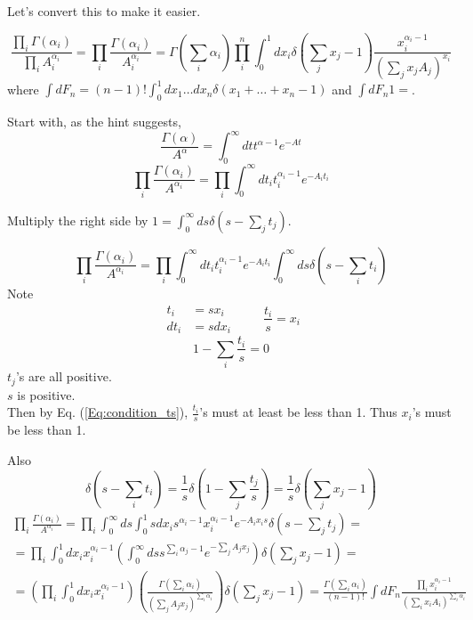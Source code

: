 \documentclass[twoside]{amsart}
\begin{document}
Let's convert this to make it easier.  

\[
\frac{ \prod_i \Gamma(\alpha_i) }{ \prod_i A_i^{\alpha_i } }  = \prod_i \frac{ \Gamma( \alpha_i ) }{ A_i^{\alpha_i } } = \Gamma( \sum_i \alpha_i ) \prod_i^n \int_0^1 dx_i \delta(\sum_j x_j - 1 ) \frac{ x_i^{ \alpha_i -1 } }{ \left(  \sum_j x_j A_j \right)^{x_i } } 
\]
where $\int dF_n = (n-1)! \int_0^1 dx_1 \dots dx_n \delta(x_1 + \dots + x_n - 1 )$ and $\int dF_n 1 =$.  

Start with, as the hint suggests, 
\[
\frac{ \Gamma(\alpha) }{ A^{\alpha} } = \int_0^{\infty} dt t^{\alpha- 1 } e^{-At}
\]
\[
 \prod_i \frac{ \Gamma(\alpha_i ) }{ A^{\alpha_i} } =\prod_i \int_0^{\infty} dt_i t_i^{\alpha_i -1 } e^{ - A_i t_i }
\]

Multiply the right side by $1 = \int_0^{\infty} ds \delta( s - \sum_j t_j )$.  

\[
\prod_i \frac{ \Gamma(\alpha_i ) }{ A^{\alpha_i }} = \prod_i \int_0^{\infty} dt_i t_i^{\alpha_i -1 } e^{ - A_i t_i} \int_0^{\infty} ds \delta( s-  \sum_i t_i  )
\]
Note
\[
\begin{aligned} t_i & = sx_i \\ dt_i & = sdx_i \end{aligned} \quad \quad \, \frac{t_i }{s} = x_i 
\]
\begin{equation}\label{Eq:condition_ts}
  1 - \sum_i \frac{ t_i }{s} = 0 
\end{equation}
$t_j$'s are all positive. \\
$s$ is positive.  \\
Then by Eq. (\ref{Eq:condition_ts}), $\frac{t_i}{s}$'s must at least be less than 1.  Thus $x_i$'s must be less than 1.  

Also 
\[
\delta(s - \sum_i t_i ) = \frac{1}{s} \delta( 1 - \sum_j \frac{ t_j}{s} )  =\frac{1}{s} \delta(\sum_j x_j - 1 ) 
\]
\[
\begin{gathered}
  \prod_i \frac{ \Gamma(\alpha_i ) }{ A^{\alpha_i }} = \prod_i \int_0^{\infty} ds \int_0^1 s dx_i s^{\alpha_i - 1 } x_i^{\alpha_i -1 } e^{- A_i x_i s } \delta( s - \sum_j t_j ) = \\ 
  = \prod_i \int_0^1 dx_i x_i^{\alpha_i  -1 } \left( \int_0^{\infty} ds s^{ \sum_i \alpha_j - 1 } e^{ - \sum_j A_j x_j } \right) \delta(\sum_j x_j - 1 ) = \\ 
  = \left( \prod_i \int_0^1 dx_i x_i^{\alpha_i - 1 } \right) \left( \frac{ \Gamma( \sum_i \alpha_i ) }{ \left( \sum_j A_j x_j \right)^{\sum_i \alpha_i } } \right) \delta(\sum_j x_j -1 ) = \frac{ \Gamma(\sum_i \alpha_i ) }{ (n-1)! } \int dF_n \frac{ \prod_i x_i^{\alpha_i -1 } }{ \left( \sum_i x_i A_i \right)^{\sum_i \alpha_i } }
\end{gathered}
\]
\end{document}
